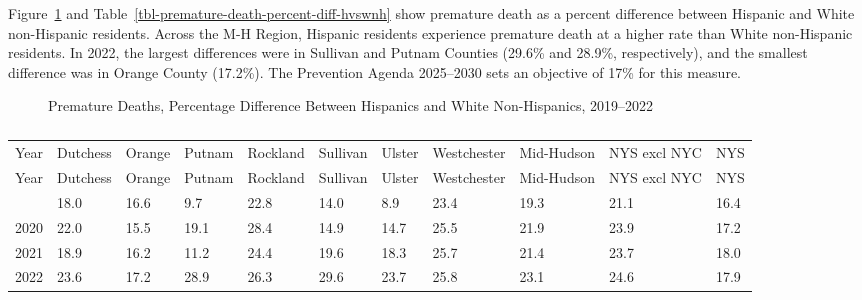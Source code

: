 \documentclass[
  english,
  letterpaper,
]{report}
\begin{document}
Figure~\ref{fig-premature-death-percent-diff-hvswnh} and
Table~\ref{tbl-premature-death-percent-diff-hvswnh} show premature death
as a percent difference between Hispanic and White non-Hispanic
residents. Across the M-H Region, Hispanic residents experience
premature death at a higher rate than White non-Hispanic residents. In
2022, the largest differences were in Sullivan and Putnam Counties
(29.6\% and 28.9\%, respectively), and the smallest difference was in
Orange County (17.2\%). The Prevention Agenda 2025--2030 sets an
objective of 17\% for this measure.

\begin{figure}


\caption{\label{fig-premature-death-percent-diff-hvswnh}Premature
Deaths, Percentage Difference Between Hispanics and White Non-Hispanics,
2019--2022}

\end{figure}%

\begin{longtable}[]{@{}lllllllllll@{}}

\caption{\label{tbl-premature-death-percent-diff-hvswnh}Premature
Deaths, Percentage Difference Between Hispanics and White Non-Hispanics,
2019--2022}

\tabularnewline

\caption{}\label{T_eed1b}\tabularnewline
\toprule\noalign{}
Year & Dutchess & Orange & Putnam & Rockland & Sullivan & Ulster &
Westchester & Mid-Hudson & NYS excl NYC & NYS \\
\midrule\noalign{}
\endfirsthead
\toprule\noalign{}
Year & Dutchess & Orange & Putnam & Rockland & Sullivan & Ulster &
Westchester & Mid-Hudson & NYS excl NYC & NYS \\
\midrule\noalign{}
\endhead
\bottomrule\noalign{}
\endlastfoot
2019 & 18.0 & 16.6 & 9.7 & 22.8 & 14.0 & 8.9 & 23.4 & 19.3 & 21.1 &
16.4 \\
2020 & 22.0 & 15.5 & 19.1 & 28.4 & 14.9 & 14.7 & 25.5 & 21.9 & 23.9 &
17.2 \\
2021 & 18.9 & 16.2 & 11.2 & 24.4 & 19.6 & 18.3 & 25.7 & 21.4 & 23.7 &
18.0 \\
2022 & 23.6 & 17.2 & 28.9 & 26.3 & 29.6 & 23.7 & 25.8 & 23.1 & 24.6 &
17.9 \\

\end{longtable}
\end{document}
